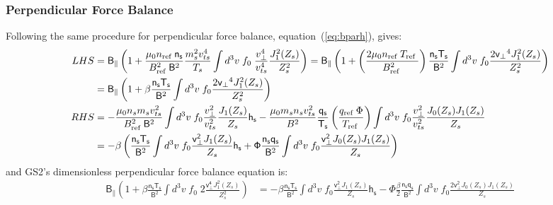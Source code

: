 \documentclass[10pt,a4paper]{article}
\newcommand{\n}[1]{{#1}_{\rm ref\;}}
\newcommand{\g}[1]{\mathsf{#1}}
\begin{document}
\subsubsection*{Perpendicular Force Balance}
Following the same procedure for perpendicular force balance,
equation~(\ref{eq:bparh}), gives:
\begin{align*}
  LHS & = \g{B_{\parallel}} \left( 1 + \frac{\mu_0 \n{n} \g{n_s}}{\n{B}^2
      \g{B}^2} \frac{m_s^2 v_{ts}^4}{T_s} \int d^3v \; f_{0} \;
    \frac{v_{\perp}^4}{v_{ts}^4} \frac{J_1^2(Z_s)}{Z_s^2} \right) =
  \g{B_{\parallel}} \left( 1 + \left( \frac{2 \mu_0 \n{n} \n{T}}{\n{B}^2}
    \right) \frac{\g{n_s} \g{T_s}}{\g{B}^2}
    \int d^3v \;  f_{0}  \frac{2 \g{v_{\perp}}^4 J_1^2(Z_s)}{Z_s^2} \right) \\
  & = \g{B_{\parallel}} \left( 1 + \g{\beta} \frac{\g{n_s} \g{T_s}}{\g{B}^2}
    \int d^3v \;  f_{0} \frac{2 \g{v_{\perp}}^4 J_1^2(Z_s)}{Z_s^2} \right) \\
  RHS & = -\frac{\mu_0 n_s m_s v_{ts}^2}{\n{B}^2 \g{B}^2} \int d^3v \; f_0
  \frac{v_{\perp}^2}{v_{ts}^2} \frac{J_1(Z_s)}{Z_s} \g{h_s} - \frac{\mu_0 m_s
    n_s v_{ts}^2}{B^2} \frac{\g{q_s}}{\g{T_s}}
  \left(\frac{\n{q}\Phi}{\n{T}}\right) \int d^3v \; f_{0}
  \frac{v_{\perp}^2}{v_{ts}^2} \frac{J_0(Z_s) J_1(Z_s)}{Z_s} \\
  & = - \g{\beta} \left( \frac{\g{n_s} \g{T_s}}{\g{B}^2} \int d^3v \; f_0
    \frac{\g{v_{\perp}^2} J_1(Z_s)}{Z_s} \g{h_s} + \g{\Phi} \frac{\g{n_s}
      \g{q_s}}{\g{B}^2} \int d^3v \; f_{0} \frac{\g{v_{\perp}^2} J_0(Z_s)
      J_1(Z_s)}{Z_s} \right)
\end{align*}
and GS2's dimensionless perpendicular force balance equation is:
\begin{align}
  \g{B_{\parallel}} \left( 1 + \g{\beta} \frac{\g{n_s} \g{T_s}}{\g{B}^2} \int
    d^3v \; f_{0} \;2 \frac{\g{v_{\perp}^4} J_1^2(Z_s)}{Z_s^2} \right) & = -
  \g{\beta} \frac{\g{n_s} \g{T_s}}{\g{B}^2} \int d^3v \; f_0
  \frac{\g{v_{\perp}^2} J_1(Z_s)}{Z_s} \g{h_s} - \g{\Phi} \frac{\g{\beta}}{2}
  \frac{\g{n_s} \g{q_s}}{\g{B}^2} \int d^3v \; f_{0} \frac{2 \g{v_{\perp}^2}
    J_0(Z_s) J_1(Z_s)}{Z_s}
\label{eq:nperpf}
\end{align}
\end{document}
